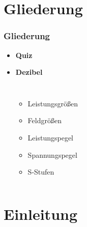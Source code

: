

\subtitle{Technik Klasse A 01: \\
  Mathematische Grundkenntnisse \\[2em]}
\date{Stand 20.04.2017}

\section{Gliederung}
\begin{frame}
\frametitle{Gliederung}
\begin{itemize}
\item \textbf{Quiz}
\item \textbf{Dezibel}
  \begin{columns}[c]
\begin{itemize}
\item Leistungsgrößen
\item Feldgrößen
\item Leistungspegel
\item Spannungspegel
\item S-Stufen
\end{itemize}
\end{columns}
\end{itemize}
\end{frame}
\section{Einleitung}

